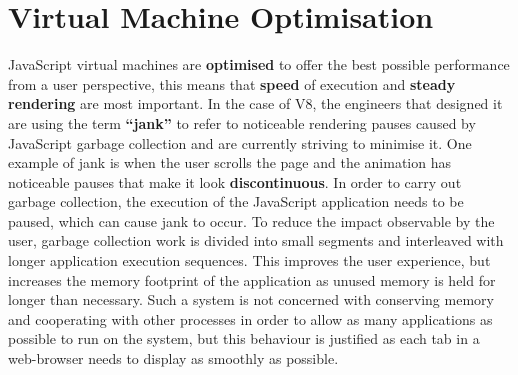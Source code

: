 \documentclass{l4proj}
\begin{document}
\section{Virtual Machine Optimisation}
\hspace*{1em} JavaScript virtual machines are \textbf{optimised} to offer the best possible performance from a user perspective, this means that \textbf{speed} of execution and \textbf{steady rendering} are most important. In the case of V8, the engineers that designed it are using the term \textbf{``jank''}\cite{jank} to refer to noticeable rendering pauses caused by JavaScript garbage collection and are currently striving to minimise it. One example of jank is when the user scrolls the page and the animation has noticeable pauses that make it look \textbf{discontinuous}. In order to carry out garbage collection, the execution of the JavaScript application needs to be paused, which can cause jank to occur. To reduce the impact observable by the user, garbage collection work is divided into small segments and interleaved with longer application execution sequences. This improves the user experience, but increases the memory footprint of the application as unused memory is held for longer than necessary. Such a system is not concerned with conserving memory and cooperating with other processes in order to allow as many applications as possible to run on the system, but this behaviour is justified as each tab in a web-browser needs to display as smoothly as possible.%
\\\\
\end{document}
